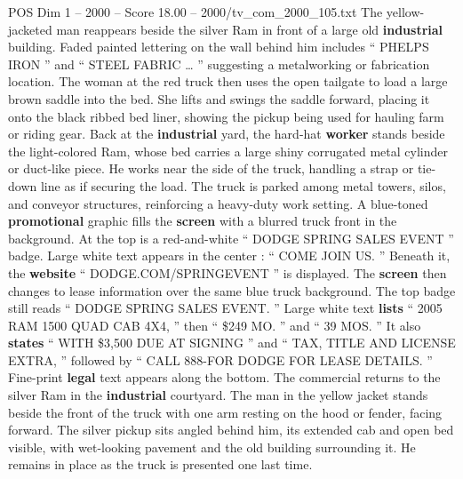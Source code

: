 \begin{textsample}{POS Dim 1 – 2000 – Score 18.00 – 2000/tv\_com\_2000\_105.txt}
The yellow-jacketed man reappears beside the silver Ram in front of a large old \textbf{industrial} building.
Faded painted lettering on the wall behind him includes “ PHELPS IRON ” and “ STEEL FABRIC … ” suggesting a metalworking or fabrication location.
The woman at the red truck then uses the open tailgate to load a large brown saddle into the bed.
She lifts and swings the saddle forward, placing it onto the black ribbed bed liner, showing the pickup being used for hauling farm or riding gear.
Back at the \textbf{industrial} yard, the hard-hat \textbf{worker} stands beside the light-colored Ram, whose bed carries a large shiny corrugated metal cylinder or duct-like piece.
He works near the side of the truck, handling a strap or tie-down line as if securing the load.
The truck is parked among metal towers, silos, and conveyor structures, reinforcing a heavy-duty work setting.
A blue-toned \textbf{promotional} graphic fills the \textbf{screen} with a blurred truck front in the background.
At the top is a red-and-white “ DODGE SPRING SALES EVENT ” badge.
Large white text appears in the center : “ COME JOIN US. ” Beneath it, the \textbf{website} “ DODGE.COM/SPRINGEVENT ” is displayed.
The \textbf{screen} then changes to lease information over the same blue truck background.
The top badge still reads “ DODGE SPRING SALES EVENT. ” Large white text \textbf{lists} “ 2005 RAM 1500 QUAD CAB 4X4, ” then “ \$249 MO. ” and “ 39 MOS. ” It also \textbf{states} “ WITH \$3,500 DUE AT SIGNING ” and “ TAX, TITLE AND LICENSE EXTRA, ” followed by “ CALL 888-FOR DODGE FOR LEASE DETAILS. ” Fine-print \textbf{legal} text appears along the bottom.
The commercial returns to the silver Ram in the \textbf{industrial} courtyard.
The man in the yellow jacket stands beside the front of the truck with one arm resting on the hood or fender, facing forward.
The silver pickup sits angled behind him, its extended cab and open bed visible, with wet-looking pavement and the old building surrounding it.
He remains in place as the truck is presented one last time.

\end{textsample}
